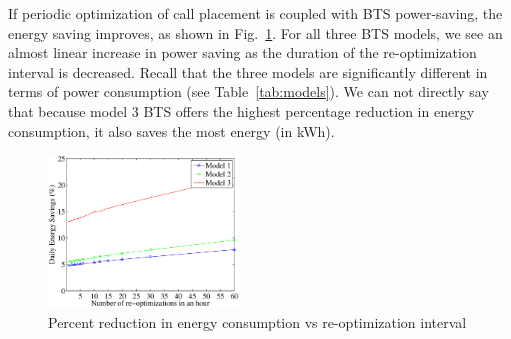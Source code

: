 If periodic optimization of call placement is coupled with BTS power-saving, the energy saving improves, as shown in Fig.~\ref{fig:results2}.
%
For all three BTS models, we see an almost linear increase in power saving as the duration of the re-optimization interval is decreased. Recall that the three models are significantly different in terms of power consumption (see Table~\ref{tab:models}). We can not directly say that because model 3 BTS offers the highest percentage reduction in energy consumption, it also saves the most energy (in kWh). %


\begin{figure}
\includegraphics[width=0.45\textwidth]{figures/percent.savings.powersaving.eps}
\caption{Percent reduction in energy consumption vs re-optimization interval}
\label{fig:results2}
\end{figure}

